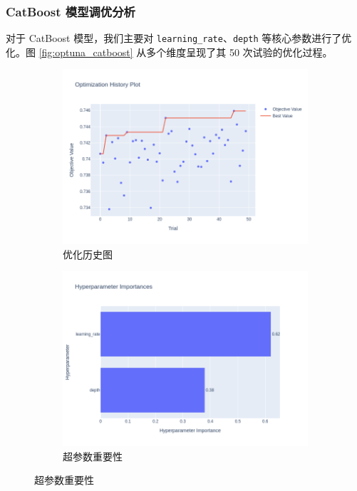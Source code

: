 \documentclass{thuemp}
\begin{document}
\subsubsection{CatBoost 模型调优分析}

对于 CatBoost 模型，我们主要对 \texttt{learning\_rate}、\texttt{depth} 等核心参数进行了优化。图 \ref{fig:optuna_catboost} 从多个维度呈现了其 50 次试验的优化过程。

\begin{figure}[H]
    \centering
    \begin{subfigure}[b]{0.49\textwidth}
        \centering
        \includegraphics[width=\textwidth]{image/results/catboost_optimization_history.png} %
        \caption{优化历史图}
        \label{fig:cat_history}
    \end{subfigure}
    \hfill
    \begin{subfigure}[b]{0.49\textwidth}
        \centering
        \includegraphics[width=\textwidth]{image/results/catboost_param_importance.png} %
        \caption{超参数重要性}
        \label{fig:cat_importance}
    \end{subfigure}
    

\end{figure}
\end{document}
